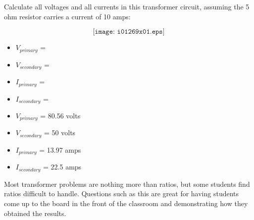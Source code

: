 

Calculate all voltages and all currents in this transformer circuit, assuming the 5 ohm resistor carries a current of 10 amps:

$$\texttt{[image: i01269x01.eps]}$$

\begin{itemize}
\item{} $V_{primary}$ = 
\item{} $V_{secondary}$ = 
\item{} $I_{primary}$ = 
\item{} $I_{secondary}$ = 
\end{itemize}







\begin{itemize}
\item{} $V_{primary}$ = 80.56 volts
\item{} $V_{secondary}$ = 50 volts
\item{} $I_{primary}$ = 13.97 amps
\item{} $I_{secondary}$ = 22.5 amps
\end{itemize}







Most transformer problems are nothing more than ratios, but some students find ratios difficult to handle.  Questions such as this are great for having students come up to the board in the front of the classroom and demonstrating how they obtained the results.




